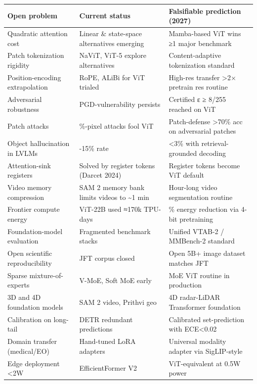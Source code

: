 {\def\LTcaptype{none} %
\begin{longtable}[]{@{}
  >{\raggedright\arraybackslash}p{}
  >{\raggedright\arraybackslash}p{}
  >{\raggedright\arraybackslash}p{}@{}}
\toprule\noalign{}
\begin{minipage}[b]{\linewidth}\raggedright
Open problem
\end{minipage} & \begin{minipage}[b]{\linewidth}\raggedright
Current status
\end{minipage} & \begin{minipage}[b]{\linewidth}\raggedright
Falsifiable prediction (2027)
\end{minipage} \\
\midrule\noalign{}
\endhead
\bottomrule\noalign{}
\endlastfoot
Quadratic attention cost & Linear \& state-space alternatives emerging & Mamba-based ViT wins ≥1 major benchmark \\
Patch tokenization rigidity & NaViT, ViT-5 explore alternatives & Content-adaptive tokenization standard \\
Position-encoding extrapolation & RoPE, ALiBi for ViT trialed & High-res transfer \textgreater2× pretrain res routine \\
Adversarial robustness & PGD-vulnerability persists & Certified ε ≥ 8/255 reached on ViT \\
Patch attacks & 4\%-pixel attacks fool ViT & Patch-defense \textgreater70\% acc on adversarial patches \\
Object hallucination in LVLMs & 5-15\% rate & \textless3\% with retrieval-grounded decoding \\
Attention-sink registers & Solved by register tokens (Darcet 2024) & Register tokens become ViT default \\
Video memory compression & SAM 2 memory bank limits videos to \textasciitilde1 min & Hour-long video segmentation routine \\
Frontier compute energy & ViT-22B used ≈170k TPU-days & 50\% energy reduction via 4-bit pretraining \\
Foundation-model evaluation & Fragmented benchmark stacks & Unified VTAB-2 / MMBench-2 standard \\
Open scientific reproducibility & JFT corpus closed & Open 5B+ image dataset matches JFT \\
Sparse mixture-of-experts & V-MoE, Soft MoE early & MoE ViT routine in production \\
3D and 4D foundation models & SAM 2 video, Prithvi geo & 4D radar-LiDAR Transformer foundation \\
Calibration on long-tail & DETR redundant predictions & Calibrated set-prediction with ECE\textless0.02 \\
Domain transfer (medical/EO) & Hand-tuned LoRA adapters & Universal modality adapter via SigLIP-style \\
Edge deployment \textless2W & EfficientFormer V2 & ViT-equivalent at 0.5W power \\
\end{longtable}
}

